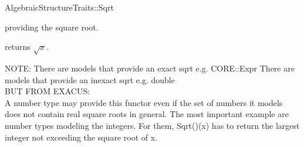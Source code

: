 \begin{ccRefConcept}{AlgebraicStructureTraits::Sqrt}

\ccDefinition

 providing the square root. 

\ccRefines 


\ccTypes
{}\ccGlue
{}

\ccOperations
{}
        { returns  $\sqrt{x}$.\\
        {\tt

        NOTE: There are models that provide an exact sqrt e.g. CORE::Expr
        There are models that provide an inexact sqrt e.g. double \\

        BUT FROM EXACUS: \\
        A number type may provide this functor even if the set of 
        numbers it 
        models does not contain real square roots in general. 
        The most important example are number types modeling the integers. 
        For them, Sqrt()(x) has to return the largest integer not exceeding 
        the square root of x.\\
        }       
        }


\ccSeeAlso


\end{ccRefConcept} 
